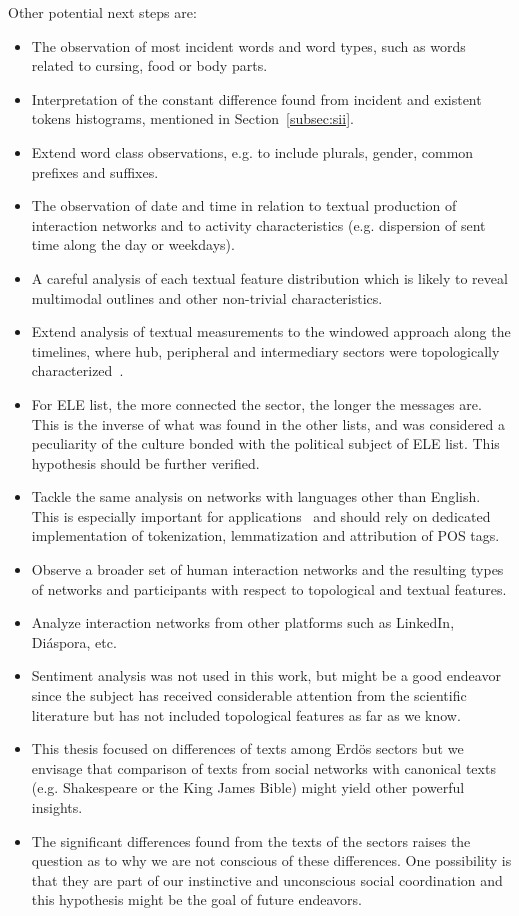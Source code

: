 Other potential next steps are:
\begin{itemize}
\item The observation of most incident words and word types,
such as words related to cursing, food or body parts.
\item Interpretation of the constant difference found from incident and existent tokens histograms,
mentioned in Section~\ref{subsec:sii}.
\item Extend word class observations, e.g. to include plurals, gender, common prefixes and suffixes.
\item The observation of date and time in relation to textual production of interaction networks and
to activity characteristics (e.g. dispersion of sent time along the day or weekdays).
\item A careful analysis of each textual feature distribution which is likely to reveal multimodal outlines and other non-trivial characteristics.
\item Extend analysis of textual measurements to the windowed approach along the timelines, where hub, peripheral and intermediary sectors were topologically characterized~\cite{stab}.
\item For ELE list, the more connected the sector, the longer the messages are.
This is the inverse of what was found in the other lists,
and was considered a peculiarity of the culture bonded with the political subject of ELE list.
This hypothesis should be further verified.
\item Tackle the same analysis on networks with languages other than English.
This is especially important for applications~\cite{ensaio}
and should rely on dedicated implementation of 
tokenization, lemmatization and attribution of POS tags.
\item Observe a broader set of human interaction networks and the resulting types
of networks and participants with respect to topological and textual features.
\item Analyze interaction networks from other platforms such as LinkedIn, Diáspora, etc.
\item Sentiment analysis was not used in this work, but might be a good endeavor since the subject has received considerable attention from the scientific literature but has not included topological features as far as we know.
\item This thesis focused on differences of texts among Erd\"os sectors but we envisage that comparison of texts from social networks with canonical texts (e.g. Shakespeare or the King James Bible) might yield other powerful insights.
\item The significant differences found from the texts of the sectors raises the question as to why we are not conscious of these differences.
One possibility is that they are part of our instinctive and unconscious social coordination and this hypothesis might be the goal of future endeavors.
\end{itemize}






